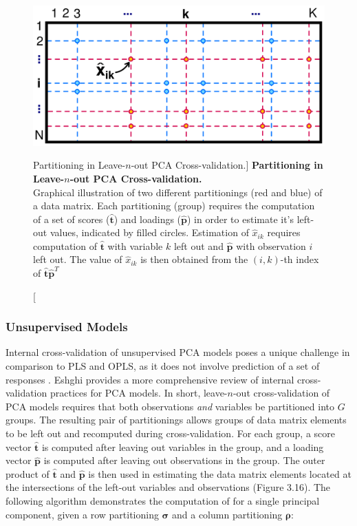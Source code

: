 \begin{figure}[h!]
\begin{center}
  \includegraphics[width=4.5in]{figs/mva/16-pcacv.png}
\end{center}
\caption
      [Partitioning in Leave-$n$-out PCA Cross-validation.]{
  {\bf Partitioning in Leave-$n$-out PCA Cross-validation.}
  \\
  Graphical illustration of two different partitionings (red and blue) of a
  data matrix. Each partitioning (group) requires the computation of a set of
  scores ($\hat{\mathbf{t}}$) and loadings ($\hat{\mathbf{p}}$) in order to
  estimate it's left-out values, indicated by filled circles. Estimation of
  $\hat{x}_{ik}$ requires computation of $\hat{\mathbf{t}}$ with variable $k$
  left out and $\hat{\mathbf{p}}$ with observation $i$ left out. The value of
  $\hat{x}_{ik}$ is then obtained from the $(i,k)$-th index of
  $\hat{\mathbf{t}} \hat{\mathbf{p}}^T$
}
\end{figure}

\subsubsection{Unsupervised Models}

\begin{doublespace}
Internal cross-validation of unsupervised PCA models poses a unique challenge
in comparison to PLS and OPLS, as it does not involve prediction of a set of
responses \cite{eastment:tech1982,krzanowski:biom1987,eshghi:cils2014}. Eshghi
\cite{eshghi:cils2014} provides a more comprehensive review of internal
cross-validation practices for PCA models. In short, leave-$n$-out
cross-validation of PCA models requires that both observations \emph{and}
variables be partitioned into $G$ groups. The resulting pair of partitionings
allows groups of data matrix elements to be left out and recomputed during
cross-validation. For each group, a score vector $\hat{\mathbf{t}}$ is
computed after leaving out variables in the group, and a loading vector
$\hat{\mathbf{p}}$ is computed after leaving out observations in the group.
The outer product of $\hat{\mathbf{t}}$ and $\hat{\mathbf{p}}$ is then used
in estimating the data matrix elements located at the intersections of the
left-out variables and observations (Figure 3.16). The following algorithm
demonstrates the computation of \qsq{} for a single principal component, given
a row partitioning $\boldsymbol{\sigma}$ and a column partitioning
$\boldsymbol{\rho}$:
\end{doublespace}

